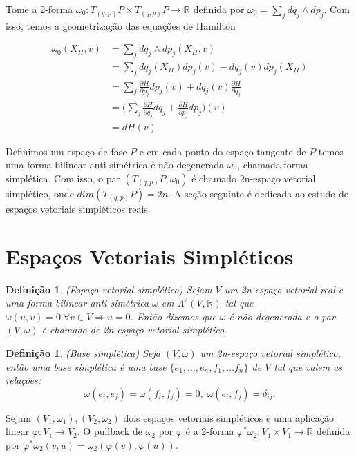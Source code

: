 \documentclass[12pt]{book}
\newtheorem{definicao}[teorema]{Definição}
\newcommand{\campohamiltonianoabrev}{X_{H}}
\newcommand{\derivadaparcial}[2]{\frac{\partial #1}{\partial #2}}
\newcommand{\formaSimpleticaabrev}{\omega_{0}}
\newcommand{\formaSimpleticaPadrao}[2]{\omega_{0}(#1, #2)}
\newcommand{\real}[1]{\mathbb{R}^{#1}}
\newcommand{\reta}{\real{}}
\begin{document}
	Tome a 2-forma $\formaSimpleticaabrev :T_{(q,p)} P \times T_{(q,p)} P \to \reta$ definida por $\formaSimpleticaabrev = \sum_{j}  dq_{j}\wedge dp_{j}$. Com isso, temos a geometrização das equações de Hamilton
	
	$$
	\begin{aligned}
	\formaSimpleticaPadrao{\campohamiltonianoabrev}{v} 
	&= \sum_{j}  dq_{j}\wedge dp_{j}(\campohamiltonianoabrev, v) 
	\\
	&= \sum_{j}  dq_{j}(\campohamiltonianoabrev)dp_{j}(v) - dq_{j}(v)dp_{j}(\campohamiltonianoabrev)
	\\
	&= \sum_{j} \derivadaparcial{H}{p_{j}}dp_{j}(v) + dq_{j}(v)\derivadaparcial{H}{q_{j}}
	\\
	&= \Big(\sum_{j} \derivadaparcial{H}{q_{j}}dq_{j} +\derivadaparcial{H}{p_{j}}dp_{j} \Big)(v)
	\\
	&= dH(v).
	\end{aligned}
	$$
	
	Definimos um espaço de fase $P$ e em cada ponto do espaço tangente de $P$ temos uma forma bilinear anti-simétrica e não-degenerada $\formaSimpleticaabrev$, chamada forma simplética. Com isso, o par $(T_{(q,p)}P, \formaSimpleticaabrev)$ é chamado 2n-espaço vetorial simplético, onde $dim(T_{(q,p)}P) = 2n$. A seção seguinte é dedicada ao estudo de espaços vetoriais simpléticos reais.
	
	\section{Espaços Vetoriais Simpléticos}
	\begin{definicao}
		(Espaço vetorial simplético) Sejam $V$ um 2n-espaço vetorial real e uma forma bilinear anti-simétrica $\omega$ em $\Lambda^{2}(V, \real{})$ tal que $\omega(u,v) = 0 \; \forall v \in V \Rightarrow u=0$. Então dizemos que $\omega$ é não-degenerada e o par $(V, \omega)$ é chamado de 2n-espaço vetorial simplético.
	\end{definicao}
	
	\begin{definicao}
		(Base simplética) Seja $(V, \omega)$ um 2n-espaço vetorial simplético, então uma base simplética é uma base $\{ e_{1},\dots, e_{n},f_{1},\dots f_{n}\}$ de $V$ tal que valem as relações:
		$$
		\omega(e_{i}, e_{j}) = \omega(f_{i}, f_{j}) = 0, \; \omega(e_{i}, f_{j}) = \delta_{ij}.
		$$
	\end{definicao}
	
	Sejam $(V_{1}, \omega_{1}), (V_{2}, \omega_{2})$ dois espaços vetoriais simpléticos e uma aplicação linear $\varphi: V_{1}\to V_{2}$. O pullback de $\omega_{2}$ por $\varphi$ é a 2-forma $\varphi^{*}\omega_{2}:V_{1} \times V_{1} \to \reta$ definida por $\varphi^{*}\omega_{2}(v,u) = \omega_{2}(\varphi(v), \varphi(u))$.
	
\end{document}
